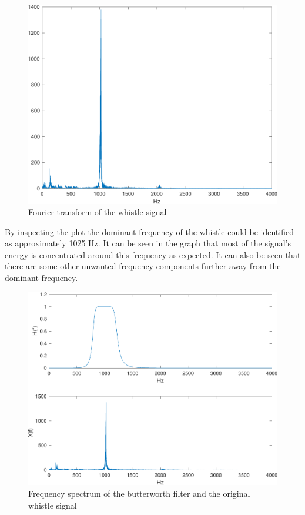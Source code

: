 \documentclass{IEEEtran}
\begin{document}
\begin{figure}[h]
  \centering
  \captionsetup{justification=centering}

  \includegraphics[width=0.8\columnwidth]{pictures/whistle_fft.pdf}
  \caption{Fourier transform of the whistle signal}
  \label{1:whistle_fft}

\end{figure}

By inspecting the plot the dominant frequency of the whistle could be
identified as approximately 1025 Hz. It can be seen in the graph that
most of the signal's energy is concentrated around this frequency as
expected. It can also be seen that there are some other unwanted
frequency components further away from the dominant frequency.

\begin{figure}[h]
  \centering
  \captionsetup{justification=centering}

  \includegraphics[width=0.8\columnwidth]{pictures/whistle_filter.pdf}
  \caption{Frequency spectrum of the butterworth filter and the original
  whistle signal}
  \label{1:whistle_filter}
\end{figure}
\end{document}
